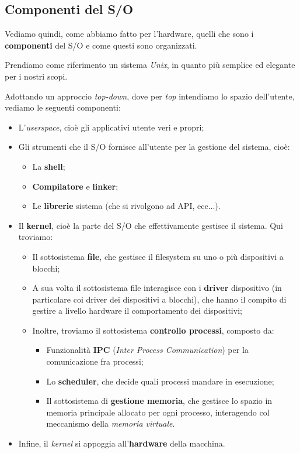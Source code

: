 \documentclass[a4paper,11pt]{article}
\begin{document}
\subsection{Componenti del S/O}
Vediamo quindi, come abbiamo fatto per l'hardware, quelli che sono i \textbf{componenti} del S/O e come questi sono organizzati.

Prendiamo come riferimento un sistema \textit{Unix}, in quanto più semplice ed elegante per i nostri scopi.

Adottando un approccio \textit{top-down}, dove per \textit{top} intendiamo lo spazio dell'utente, vediamo le seguenti componenti:
\begin{itemize}
	\item L'\textit{userspace}, cioè gli applicativi utente veri e propri;
	\item Gli strumenti che il S/O fornisce all'utente per la gestione del sistema, cioè:
		\begin{itemize}
			\item La \textbf{shell};
			\item \textbf{Compilatore} e \textbf{linker};
			\item Le \textbf{librerie} sistema (che si rivolgono ad API, ecc...).
		\end{itemize}
	\item Il \textbf{kernel}, cioè la parte del S/O che effettivamente gestisce il sistema. Qui troviamo:
		\begin{itemize}
			\item Il sottosistema \textbf{file}, che gestisce il filesystem su uno o più dispositivi a blocchi;
			\item A sua volta il sottosistema file interagisce con i \textbf{driver} dispositivo (in particolare coi driver dei dispositivi a blocchi), che hanno il compito di gestire a livello hardware il comportamento dei dispositivi;
			\item Inoltre, troviamo il sottosistema \textbf{controllo processi}, composto da:
				\begin{itemize}
					\item Funzionalità \textbf{IPC} (\textit{Inter Process Communication}) per la comunicazione fra processi;
					\item Lo \textbf{scheduler}, che decide quali processi mandare in esecuzione;
					\item Il sottosistema di \textbf{gestione memoria}, che gestisce lo spazio in memoria principale allocato per ogni processo, interagendo col meccanismo della \textit{memoria virtuale}.
				\end{itemize}
		\end{itemize}
	\item Infine, il \textit{kernel} si appoggia all'\textbf{hardware} della macchina. 
\end{itemize}
\end{document}
